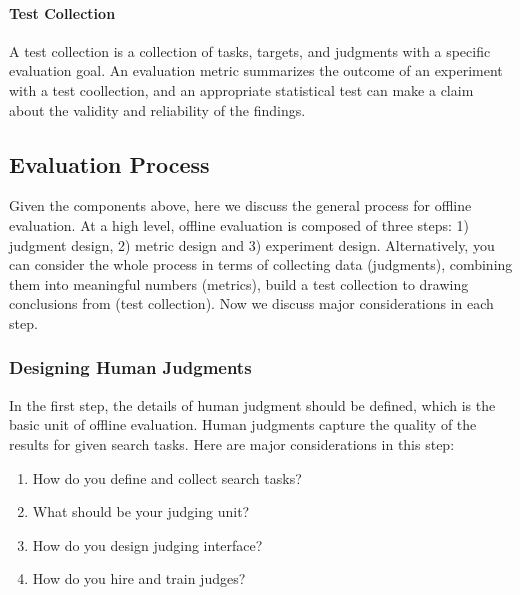 \paragraph{Test Collection} A test collection is a collection of tasks, targets, and judgments with a specific evaluation goal. An evaluation metric summarizes the outcome of an experiment with a test coollection, and an appropriate statistical test can make a claim about the validity and reliability of the findings.

\subsection{Evaluation Process}
Given the components above, here we discuss the general process for offline evaluation. At a high level, offline evaluation is composed of three steps: 1) judgment design, 2) metric design and 3) experiment design. Alternatively, you can consider the whole process in terms of collecting data (judgments), combining them into meaningful numbers (metrics), build a test collection to drawing conclusions from (test collection). Now we discuss major considerations in each step.

\subsubsection{Designing Human Judgments}

In the first step, the details of human judgment should be defined, which is the basic unit of offline evaluation. Human judgments capture the quality of the results for given search tasks. Here are major considerations in this step:

\begin{enumerate}
	\item How do you define and collect search tasks?
	\item What should be your judging unit?
	\item How do you design judging interface?
	\item How do you hire and train judges?
\end{enumerate}

